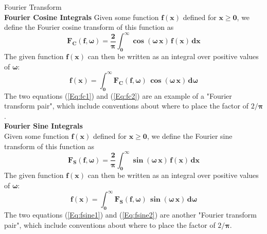\begin{compactitem}
\item {Fourier Transform}\\
\textbf{Fourier Cosine Integrals}
Given some function $\mathbf{f(x)}$ defined for $\mathbf{x \geq 0}$,
  we define the Fourier cosine transform  of this function as
\begin{equation}  \label{Eq:fc1}
\mathbf{F_{C}(f,\boldsymbol{\omega}) = \frac{2}{\boldsymbol{\pi}}
  \int_{0}^{\infty} \boldsymbol{\cos}(\boldsymbol{\omega}\,x)\,f(x)\,dx }
\end{equation}
The given function $\mathbf{f(x)}$ can then be written as an integral
  over positive values of $\boldsymbol{\omega}$:
\begin{equation}  \label{Eq:fc2}
\mathbf{f(x) = \int_{0}^{\infty} F_{C}(f,\boldsymbol{\omega})\,
    \cos(\boldsymbol{\omega}\,x)\,d\boldsymbol{\omega} }
\end{equation}
The two equations (\ref{Eq:fc1}) and (\ref{Eq:fc2}) are an example of
  a "Fourier transform pair", which include conventions about where
  to place the factor of $2/\boldsymbol{\pi}$.\\

\textbf{Fourier Sine Integrals}\\
Given some function $\mathbf{f(x)}$ defined for $\mathbf{x \geq 0}$,
  we define the Fourier sine transform  of this function as
\begin{equation}  \label{Eq:fsine1}
\mathbf{F_{S}(f,\boldsymbol{\omega}) = \frac{2}{\boldsymbol{\pi}}
  \int_{0}^{\infty} \boldsymbol{\sin}(\boldsymbol{\omega}\,x)\,f(x)\,dx }
\end{equation}
The given function $\mathbf{f(x)}$ can then be written as an integral
  over positive values of $\boldsymbol{\omega}$:
\begin{equation}  \label{Eq:fsine2}
\mathbf{f(x) = \int_{0}^{\infty} F_{S}(f,\boldsymbol{\omega})\,
    \sin(\boldsymbol{\omega}\,x)\,d\boldsymbol{\omega} }
\end{equation}
The two equations (\ref{Eq:fsine1}) and (\ref{Eq:fsine2}) are another
   "Fourier transform pair", which include conventions about where
  to place the factor of $2/\boldsymbol{\pi}$.


\end{compactitem}
